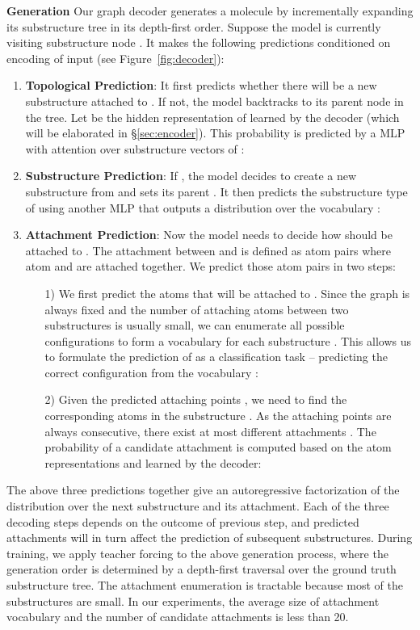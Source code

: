 \documentclass{article} \usepackage{iclr2020_conference,times}
\begin{document}
\textbf{Generation } 
Our graph decoder generates a molecule  by incrementally expanding its substructure tree in its depth-first order. 
Suppose the model is currently visiting substructure node . It makes the following predictions conditioned on encoding of input  (see Figure~\ref{fig:decoder}):
\begin{enumerate}[leftmargin=*,topsep=0pt,itemsep=0pt]
    \item \textbf{Topological Prediction}: It first predicts whether there will be a new substructure attached to . If not, the model backtracks to its parent node  in the tree. Let  be the hidden representation of  learned by the decoder (which will be elaborated in \S\ref{sec:encoder}). This probability is predicted by a MLP with attention over substructure vectors  of : 
    
    
    \item \textbf{Substructure Prediction}: If , the model decides to create a new substructure  from  and sets its parent . It then predicts the substructure type of  using another MLP that outputs a distribution over the vocabulary :
    
    
    \item \textbf{Attachment Prediction}: Now the model needs to decide how  should be attached to . The attachment between  and  is defined as atom pairs  where atom  and  are attached together. We predict those atom pairs in two steps:
    
    \begin{enumerate}[leftmargin=*,topsep=0pt,itemsep=0pt] 
        \item[1)] We first predict the atoms  that will be attached to . Since the graph  is always fixed and the number of attaching atoms between two substructures is usually small, we can enumerate all possible configurations  to form a vocabulary  for each substructure . This allows us to formulate the prediction of  as a classification task --  predicting the correct configuration  from the vocabulary :
        
        \item[2)] Given the predicted attaching points , we need to find the corresponding atoms  in the substructure . As the attaching points are always consecutive, there exist at most  different attachments . The probability of a candidate attachment  is computed based on the atom representations  and  learned by the decoder:
        
    \end{enumerate}
\end{enumerate}
The above three predictions together give an autoregressive factorization of the distribution over the next substructure and its attachment. Each of the three decoding steps depends on the outcome of previous step, and predicted attachments will in turn affect the prediction of subsequent substructures.
During training, we apply teacher forcing to the above generation process, where the generation order is determined by a depth-first traversal over the ground truth substructure tree.
The attachment enumeration is tractable because most of the substructures are small. In our experiments, the average size of attachment vocabulary  and the number of candidate attachments is less than 20.
\end{document}
